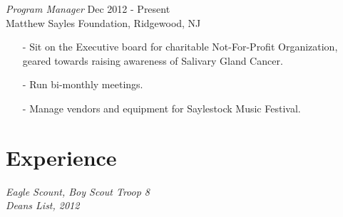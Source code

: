 \documentclass[margin, 10pt]{res} %
\begin{document}
\begin{resume}
{\sl Program Manager} \hfill Dec 2012 - Present \\
Matthew Sayles Foundation, Ridgewood, NJ
\begin{itemize} \itemsep -2pt
\item[-] Sit on the Executive board for charitable Not-For-Profit Organization, geared towards raising awareness of Salivary Gland Cancer.
\item[-] Run bi-monthly meetings.
\item[-] Manage vendors and equipment for Saylestock Music Festival.
\end{itemize}


\section{Experience} 

{\sl Eagle Scount, Boy Scout Troop 8} \\
{\sl Deans List, 2012}

\end{resume}
\end{document}
